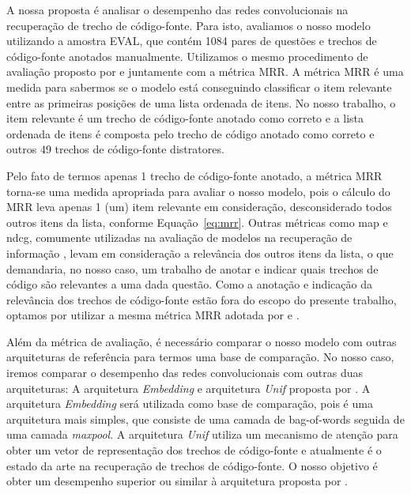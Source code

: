 A nossa proposta é analisar o desempenho das redes convolucionais na recuperação de trecho de código-fonte. Para isto, avaliamos o nosso modelo utilizando a amostra EVAL, que contém 1084 pares de questões e trechos de código-fonte anotados manualmente. Utilizamos o mesmo procedimento de avaliação proposto por \cite{iyer-etal-2016-summarizing} e \cite{yao-2018} juntamente com a métrica MRR. A métrica MRR é uma medida para sabermos se o modelo está conseguindo classificar o item relevante entre as primeiras posições de uma lista ordenada de itens. 
No nosso trabalho, o item relevante é um trecho de código-fonte anotado como correto e a lista ordenada de itens é composta pelo trecho de código anotado como correto e outros 49 trechos de código-fonte distratores. 

Pelo fato de termos apenas 1 trecho de código-fonte anotado, a métrica MRR torna-se uma medida apropriada para avaliar o nosso modelo, pois o cálculo do MRR leva apenas 1 (um) item relevante em consideração, desconsiderado todos outros itens da lista, conforme Equação~\ref{eq:mrr}. Outras métricas como \acrshort{map} e \acrshort{ndcg}, comumente utilizadas na avaliação de modelos na recuperação de informação \citep{kun-learning-to-rank:2018}, levam em consideração a relevância dos outros itens da lista, o que demandaria, no nosso caso, um trabalho de anotar e indicar quais trechos de código são relevantes a uma dada questão. Como a anotação e indicação da relevância dos trechos de código-fonte estão fora do escopo do presente trabalho, optamos por utilizar a mesma métrica MRR adotada por \cite{iyer-etal-2016-summarizing} e \cite{yao-2018}.

Além da métrica de avaliação, é necessário comparar o nosso modelo com outras arquiteturas de referência para termos uma base de comparação. No nosso caso, iremos comparar o desempenho das redes convolucionais com outras duas arquiteturas: A arquitetura \textit{Embedding} e arquitetura \textit{Unif} proposta por \cite{cambronero-deep-learning-code-search:2019}. A arquitetura \textit{Embedding} será utilizada como base de comparação, pois é uma arquitetura mais simples, que consiste de uma camada de \gls{bag-of-words} seguida de uma camada \textit{maxpool}. A arquitetura \textit{Unif} utiliza um mecanismo de atenção para obter um vetor de representação dos trechos de código-fonte e atualmente é o estado da arte na recuperação de trechos de código-fonte. O nosso objetivo é obter um desempenho superior ou similar à arquitetura proposta por \cite{cambronero-deep-learning-code-search:2019}.



